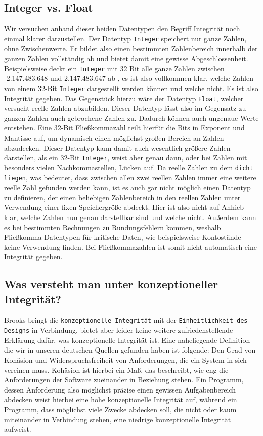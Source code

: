 \documentclass[a4paper, ngerman, 12pt, usenames, dvipsnames]{article}
\begin{document}
\subsection{Integer vs. Float}
Wir versuchen anhand dieser beiden Datentypen den Begriff Integrität noch einmal klarer darzustellen. Der Datentyp \texttt{Integer} speichert nur ganze Zahlen, ohne Zwischenwerte. Er bildet also einen bestimmten Zahlenbereich innerhalb der ganzen Zahlen vollständig ab und bietet damit eine gewisse Abgeschlossenheit. Beispielsweise deckt ein \texttt{Integer} mit 32 Bit alle ganze Zahlen zwischen -2.147.483.648 und 2.147.483.647 ab \cite{dewiki:integer}, es ist also vollkommen klar, welche Zahlen von einem 32-Bit \texttt{Integer} dargestellt werden können und welche nicht. Es ist also Integrität gegeben. Das Gegenstück hierzu wäre der Datentyp \texttt{Float}, welcher versucht reelle Zahlen abzubilden. Dieser Datentyp lässt also im Gegensatz zu ganzen Zahlen auch gebrochene Zahlen zu. Dadurch können auch ungenaue Werte entstehen. Eine 32-Bit Fließkommazahl teilt hierfür die Bits in Exponent und Mantisse auf, um dynamisch einen möglichst großen Bereich an Zahlen abzudecken. Dieser Datentyp kann damit auch wesentlich größere Zahlen darstellen, als ein 32-Bit \texttt{Integer}, weist aber genau dann, oder bei Zahlen mit besonders vielen Nachkommastellen, Lücken auf. \cite{dewiki:float} Da reelle Zahlen zu dem \texttt{dicht liegen}, was bedeutet, dass zwischen allen zwei reellen Zahlen immer eine weitere reelle Zahl gefunden werden kann, ist es auch gar nicht möglich einen Datentyp zu definieren, der einen beliebigen Zahlenbereich in den reellen Zahlen unter Verwendung einer fixen Speichergröße abdeckt. Hier ist also nicht auf Anhieb klar, welche Zahlen nun genau darstellbar sind und welche nicht. Außerdem kann es bei bestimmten Rechnungen zu Rundungsfehlern kommen, weshalb Fließkomma-Datentypen für kritische Daten, wie beispielsweise Kontostände keine Verwendung finden. Bei Fließkommazahlen ist somit nicht automatisch eine Integrität gegeben.

\subsection{Was versteht man unter konzeptioneller Integrität?}
Brooks bringt die \texttt{konzeptionelle Integrität} mit der \texttt{Einheitlichkeit des Designs} in Verbindung, bietet aber leider keine weitere zufriedenstellende Erklärung
dafür, was konzeptionelle Integrität ist. 
Eine naheliegende Definition die wir in unseren deutschen Quellen gefunden haben ist folgende:
Den Grad von Kohäsion und Widerspruchsfreiheit von Anforderungen, die ein System in sich vereinen muss.
Kohäsion ist hierbei ein Maß, das beschreibt, wie eng die Anforderungen der Software zueinander in Beziehung stehen.\cite{architektur} Ein Programm, dessen Anforderung also möglichst präzise einen gewissen Aufgabenbereich abdecken weist hierbei eine hohe konzeptionelle Integrität auf, während ein Programm, dass möglichst viele Zwecke abdecken soll, die nicht oder kaum miteinander in Verbindung stehen, eine niedrige konzeptionelle Integrität aufweist.
\end{document}
